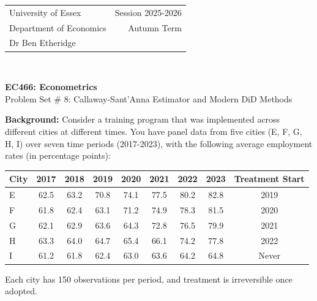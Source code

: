 \documentclass[12pt,a4paper]{article}
\begin{document}
\begin{tabular}{l r}
University of Essex  \hspace{35ex}& Session 2025-2026 \\
Department of Economics \hspace{35ex} & Autumn Term\\
Dr Ben Etheridge \hspace{35ex} &
\end{tabular}
\\
\begin{center}
\large{\textbf{EC466: Econometrics }\\
Problem Set \# 8: Callaway-Sant'Anna Estimator and Modern DiD Methods}
\end{center}
\vspace*{0.5cm}

\textbf{Background:} Consider a training program that was implemented across different cities at different times. You have panel data from five cities (E, F, G, H, I) over seven time periods (2017-2023), with the following average employment rates (in percentage points):

\vspace{1em}
\begin{center}
\begin{tabular}{lccccccc|c}
\hline
City & 2017 & 2018 & 2019 & 2020 & 2021 & 2022 & 2023 & Treatment Start \\
\hline
E & 62.5 & 63.2 & 70.8 & 74.1 & 77.5 & 80.2 & 82.8 & 2019 \\
F & 61.8 & 62.4 & 63.1 & 71.2 & 74.9 & 78.3 & 81.5 & 2020 \\
G & 62.1 & 62.9 & 63.6 & 64.3 & 72.8 & 76.5 & 79.9 & 2021 \\
H & 63.3 & 64.0 & 64.7 & 65.4 & 66.1 & 74.2 & 77.8 & 2022 \\
I & 61.2 & 61.8 & 62.4 & 63.0 & 63.6 & 64.2 & 64.8 & Never \\
\hline
\end{tabular}
\end{center}
Each city has 150 observations per period, and treatment is irreversible once adopted.
\vspace{1em}
\end{document}

